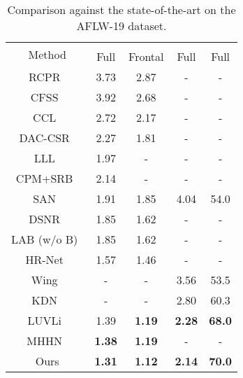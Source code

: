 \documentclass{bmvc2k}
\newcommand{\best}[1]{\color{red}\textbf{#1}}
\newcommand{\secondb}[1]{\color{blue}\textbf{#1}}
\begin{document}
\begin{table}[!htbp]
	\caption{Comparison against the state-of-the-art on the AFLW-19 dataset.}\label{tab:sota_aflw19}
	\centering
		\begin{tabular}{ccccc}
			\toprule
			\multirow{2}{*}{Method} &  \multicolumn{2}{c}{} &  &  \\
			\cline{2-5}
			& Full & Frontal & Full & Full \\
			\midrule
			RCPR~\cite{burgos2013robust} & 3.73 & 2.87 & - & - \\
            CFSS~\cite{zhu2015cfss} & 3.92 & 2.68 & - & - \\
            CCL~\cite{zhu2016unconstrained} & 2.72 & 2.17 & - & - \\
            DAC-CSR~\cite{feng2017dynamic} & 2.27 & 1.81 & - & - \\
            LLL~\cite{robinson2019laplace} & 1.97 & - & - & - \\
            CPM+SRB~\cite{dong2018supervision} & 2.14 & - & - & - \\
            SAN~\cite{dong2018style} & 1.91 & 1.85 & 4.04 & 54.0 \\
            DSNR~\cite{miao2018direct} & 1.85 & 1.62 & - & - \\
            LAB (w/o B)~\cite{wu2018look} & 1.85 & 1.62 & - & - \\
            HR-Net~\cite{sun2019high} & 1.57 & 1.46 & - & - \\
            Wing~\cite{feng2018wing} & - & - & 3.56 & 53.5 \\
            KDN~\cite{chen2019face} & - & - & 2.80 & 60.3 \\
            LUVLi~\cite{kumar2020luvli} & 1.39 & \secondb{1.19} & \secondb{2.28} & \secondb{68.0} \\
            MHHN~\cite{wan2020robust} & \secondb{1.38} & \secondb{1.19} & - & - \\
            Ours & \best{1.31} & \best{1.12} & \best{2.14} & \best{70.0} \\
			\bottomrule
		\end{tabular}
\end{table}
\end{document}
